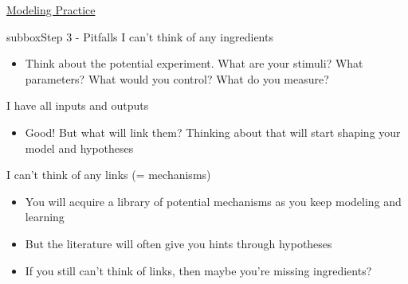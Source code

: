 \begin{textbox}{\href{https://compneuro.neuromatch.io/projects/modelingsteps/ModelingSteps_5through10.html}{Modeling Practice } }
\begin{subbox}{subbox}{Step 3 - Pitfalls }
I can’t think of any ingredients
\begin{itemize}
    \item Think about the potential experiment. What are your stimuli? What parameters? What would you control? What do you measure? \end{itemize} 

I have all inputs and outputs
 \begin{itemize}
    \item Good! But what will link them? Thinking about that will start shaping your model and hypotheses \end{itemize} 

I can’t think of any links (= mechanisms)
 \begin{itemize}
    \item You will acquire a library of potential mechanisms as you keep modeling and learning
   \item But the literature will often give you hints through hypotheses
  \item If you still can't think of links, then maybe you're missing ingredients?
 \end{itemize} 
 \end{subbox}
 
 
\end{textbox}


